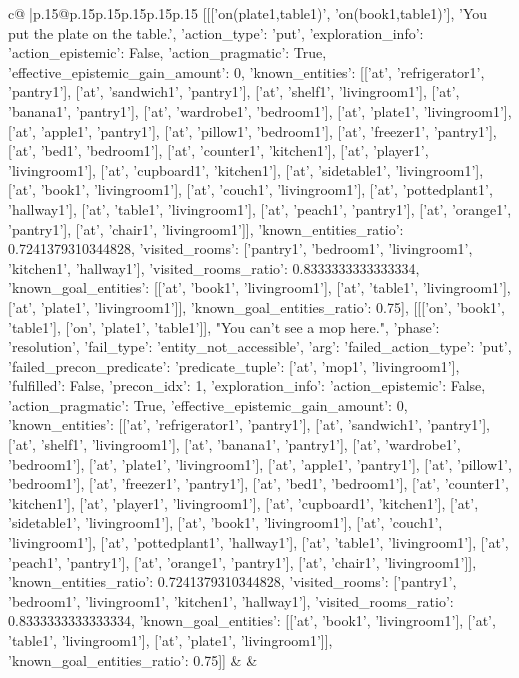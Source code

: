 \documentclass{article}
\begin{document}
{\begin{supertabular}{c@{$\;$}|p{.15\linewidth}@{}p{.15\linewidth}p{.15\linewidth}p{.15\linewidth}p{.15\linewidth}p{.15\linewidth}}
{{{	 [[['on(plate1,table1)', 'on(book1,table1)'], 'You put the plate on the table.', {'action_type': 'put', 'exploration_info': {'action_epistemic': False, 'action_pragmatic': True, 'effective_epistemic_gain_amount': 0, 'known_entities': [['at', 'refrigerator1', 'pantry1'], ['at', 'sandwich1', 'pantry1'], ['at', 'shelf1', 'livingroom1'], ['at', 'banana1', 'pantry1'], ['at', 'wardrobe1', 'bedroom1'], ['at', 'plate1', 'livingroom1'], ['at', 'apple1', 'pantry1'], ['at', 'pillow1', 'bedroom1'], ['at', 'freezer1', 'pantry1'], ['at', 'bed1', 'bedroom1'], ['at', 'counter1', 'kitchen1'], ['at', 'player1', 'livingroom1'], ['at', 'cupboard1', 'kitchen1'], ['at', 'sidetable1', 'livingroom1'], ['at', 'book1', 'livingroom1'], ['at', 'couch1', 'livingroom1'], ['at', 'pottedplant1', 'hallway1'], ['at', 'table1', 'livingroom1'], ['at', 'peach1', 'pantry1'], ['at', 'orange1', 'pantry1'], ['at', 'chair1', 'livingroom1']], 'known_entities_ratio': 0.7241379310344828, 'visited_rooms': ['pantry1', 'bedroom1', 'livingroom1', 'kitchen1', 'hallway1'], 'visited_rooms_ratio': 0.8333333333333334, 'known_goal_entities': [['at', 'book1', 'livingroom1'], ['at', 'table1', 'livingroom1'], ['at', 'plate1', 'livingroom1']], 'known_goal_entities_ratio': 0.75}}], [[['on', 'book1', 'table1'], ['on', 'plate1', 'table1']], "You can't see a mop here.", {'phase': 'resolution', 'fail_type': 'entity_not_accessible', 'arg': {'failed_action_type': 'put', 'failed_precon_predicate': {'predicate_tuple': ['at', 'mop1', 'livingroom1'], 'fulfilled': False, 'precon_idx': 1}}, 'exploration_info': {'action_epistemic': False, 'action_pragmatic': True, 'effective_epistemic_gain_amount': 0, 'known_entities': [['at', 'refrigerator1', 'pantry1'], ['at', 'sandwich1', 'pantry1'], ['at', 'shelf1', 'livingroom1'], ['at', 'banana1', 'pantry1'], ['at', 'wardrobe1', 'bedroom1'], ['at', 'plate1', 'livingroom1'], ['at', 'apple1', 'pantry1'], ['at', 'pillow1', 'bedroom1'], ['at', 'freezer1', 'pantry1'], ['at', 'bed1', 'bedroom1'], ['at', 'counter1', 'kitchen1'], ['at', 'player1', 'livingroom1'], ['at', 'cupboard1', 'kitchen1'], ['at', 'sidetable1', 'livingroom1'], ['at', 'book1', 'livingroom1'], ['at', 'couch1', 'livingroom1'], ['at', 'pottedplant1', 'hallway1'], ['at', 'table1', 'livingroom1'], ['at', 'peach1', 'pantry1'], ['at', 'orange1', 'pantry1'], ['at', 'chair1', 'livingroom1']], 'known_entities_ratio': 0.7241379310344828, 'visited_rooms': ['pantry1', 'bedroom1', 'livingroom1', 'kitchen1', 'hallway1'], 'visited_rooms_ratio': 0.8333333333333334, 'known_goal_entities': [['at', 'book1', 'livingroom1'], ['at', 'table1', 'livingroom1'], ['at', 'plate1', 'livingroom1']], 'known_goal_entities_ratio': 0.75}}]] 
	  } 
	   } 
	   } 
	 & & \\ 
 


\end{supertabular}}
\end{document}
